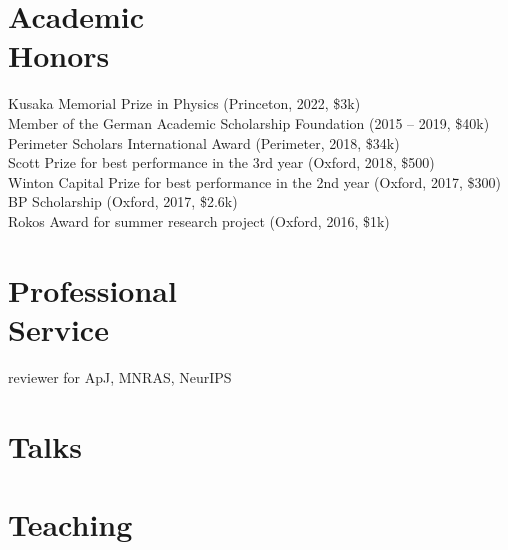 \documentclass[margin]{res}
\begin{document}
\begin{resume}
\section{Academic \\ Honors}
Kusaka Memorial Prize in Physics (Princeton, 2022, \$3k)\\
Member of the German Academic Scholarship Foundation (2015 -- 2019, \$40k)\\
Perimeter Scholars International Award (Perimeter, 2018, \$34k)\\
Scott Prize for best performance in the 3rd year (Oxford, 2018, \$500)\\
Winton Capital Prize for best performance in the 2nd year (Oxford, 2017, \$300)\\
BP Scholarship (Oxford, 2017, \$2.6k)\\
Rokos Award for summer research project (Oxford, 2016, \$1k)\\

\section{Professional \\ Service}
reviewer for ApJ, MNRAS, NeurIPS

\section{Talks}


\section{Teaching}



\end{resume}
\end{document}
